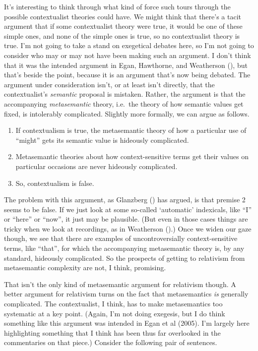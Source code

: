 \documentclass[
  10pt,
  letterpaper,
  DIV=11,
  numbers=noendperiod,
  twoside]{scrartcl}
\providecommand{\tightlist}{%
  \setlength{\itemsep}{0pt}\setlength{\parskip}{0pt}}\usepackage{longtable,booktabs,array}
\begin{document}
It's interesting to think through what kind of force such tours through
the possible contextualist theories could have. We might think that
there's a tacit argument that if some contextualist theory were true, it
would be one of these simple ones, and none of the simple ones is true,
so no contextualist theory is true. I'm not going to take a stand on
exegetical debates here, so I'm not going to consider who may or may not
have been making such an argument. I don't think that it was the
intended argument in Egan, Hawthorne, and Weatherson
(), but that's beside the point,
because it is an argument that's now being debated. The argument under
consideration isn't, or at least isn't directly, that the
contextualist's \emph{semantic} proposal is mistaken. Rather, the
argument is that the accompanying \emph{metasemantic} theory, i.e.~the
theory of how semantic values get fixed, is intolerably complicated.
Slightly more formally, we can argue as follows.

\begin{enumerate}
\def\labelenumi{\arabic{enumi}.}
\tightlist
\item
  If contextualism is true, the metasemantic theory of how a particular
  use of ``might'' gets its semantic value is hideously complicated.
\item
  Metasemantic theories about how context-sensitive terms get their
  values on particular occasions are never hideously complicated.
\item
  So, contextualism is false.
\end{enumerate}

The problem with this argument, as Glanzberg
() has argued, is that premise 2 seems
to be false. If we just look at some so-called `automatic' indexicals,
like ``I'' or ``here'' or ``now'', it just may be plausible. (But even
in those cases things are tricky when we look at recordings, as in
Weatherson ().) Once we widen
our gaze though, we see that there are examples of uncontroversially
context-sensitive terms, like ``that'', for which the accompanying
metasemantic theory is, by any standard, hideously complicated. So the
prospects of getting to relativism from metasemantic complexity are not,
I think, promising.

That isn't the only kind of metasemantic argument for relativism though.
A better argument for relativism turns on the fact that metasemantics
\emph{is} generally complicated. The contextualist, I think, has to make
metasemantics too systematic at a key point. (Again, I'm not doing
exegesis, but I do think something like this argument was intended in
Egan et al (2005). I'm largely here highlighting something that I think
has been thus far overlooked in the commentaries on that piece.)
Consider the following pair of sentences.
\end{document}
